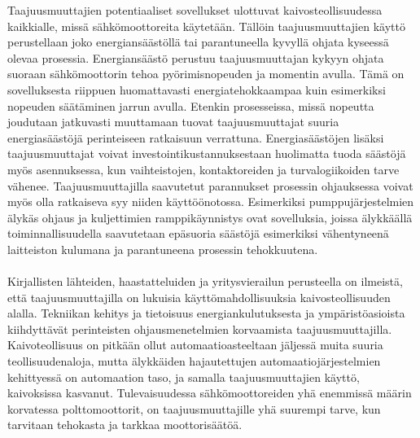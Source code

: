 \documentclass[finnish,12pt,a4paper,pdftex,elec,utf8]{aaltothesis}
\begin{document}
Taajuusmuuttajien potentiaaliset sovellukset ulottuvat kaivosteollisuudessa kaikkialle, missä sähkömoottoreita käytetään. Tällöin taajuusmuuttajien käyttö perustellaan joko energiansäästöllä tai parantuneella kyvyllä ohjata kyseessä olevaa prosessia. Energiansäästö perustuu taajuusmuuttajan kykyyn ohjata suoraan sähkömoottorin tehoa pyörimisnopeuden ja momentin avulla. Tämä on sovelluksesta riippuen huomattavasti energiatehokkaampaa kuin esimerkiksi nopeuden säätäminen jarrun avulla. Etenkin prosesseissa, missä nopeutta joudutaan jatkuvasti muuttamaan tuovat taajuusmuuttajat suuria energiasäästöjä perinteiseen ratkaisuun verrattuna. Energiasäästöjen lisäksi taajuusmuuttajat voivat investointikustannuksestaan huolimatta tuoda säästöjä myös asennuksessa, kun vaihteistojen, kontaktoreiden ja turvalogiikoiden tarve vähenee. Taajuusmuuttajilla saavutetut parannukset prosessin ohjauksessa voivat myös olla ratkaiseva syy niiden käyttöönotossa. Esimerkiksi pumppujärjestelmien älykäs ohjaus ja kuljettimien ramppikäynnistys ovat sovelluksia, joissa älykkäällä toiminnallisuudella saavutetaan epäsuoria säästöjä esimerkiksi vähentyneenä laitteiston kulumana ja parantuneena prosessin tehokkuutena.
\\\\
Kirjallisten lähteiden, haastatteluiden ja yritysvierailun perusteella on ilmeistä, että taajuusmuuttajilla on lukuisia käyttömahdollisuuksia kaivosteollisuuden alalla. Tekniikan kehitys ja tietoisuus energiankulutuksesta ja ympäristöasioista kiihdyttävät perinteisten ohjausmenetelmien korvaamista  taajuusmuuttajilla. Kaivoteollisuus on pitkään ollut automaatioasteeltaan jäljessä muita suuria teollisuudenaloja, mutta älykkäiden hajautettujen automaatiojärjestelmien kehittyessä on automaation taso, ja samalla taajuusmuuttajien käyttö, kaivoksissa kasvanut. Tulevaisuudessa sähkömoottoreiden yhä enemmissä määrin korvatessa polttomoottorit, on taajuusmuuttajille yhä suurempi tarve, kun tarvitaan tehokasta ja tarkkaa moottorisäätöä.




\clearpage
\end{document}
